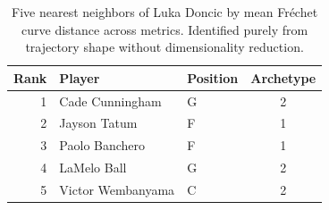 \begin{table}[htbp]
  \centering\small
  \begin{tabular}{rllc}
    \toprule
    Rank & Player & Position & Archetype \\
    \midrule
    1 & Cade Cunningham & G & 2 \\
    2 & Jayson Tatum & F & 1 \\
    3 & Paolo Banchero & F & 1 \\
    4 & LaMelo Ball & G & 2 \\
    5 & Victor Wembanyama & C & 2 \\
    \bottomrule
  \end{tabular}
  \caption{Five nearest neighbors of Luka Doncic by mean Fr\'{e}chet curve distance across metrics. Identified purely from trajectory shape without dimensionality reduction.}
  \label{tab:Luka_Doncic_frechet_curve_neighbors}
\end{table}


